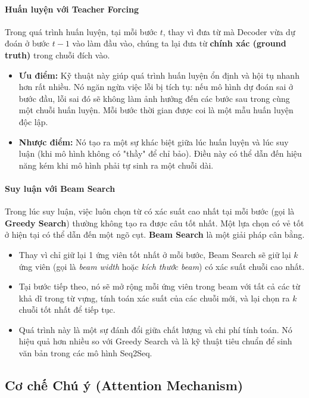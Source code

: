 \paragraph{Huấn luyện với Teacher Forcing}
Trong quá trình huấn luyện, tại mỗi bước $t$, thay vì đưa từ mà Decoder vừa dự đoán ở bước $t-1$ vào làm đầu vào, chúng ta lại đưa từ \textbf{chính xác (ground truth)} trong chuỗi đích vào.
\begin{itemize}
    \item \textbf{Ưu điểm:} Kỹ thuật này giúp quá trình huấn luyện ổn định và hội tụ nhanh hơn rất nhiều. Nó ngăn ngừa việc lỗi bị tích tụ: nếu mô hình dự đoán sai ở bước đầu, lỗi sai đó sẽ không làm ảnh hưởng đến các bước sau trong cùng một chuỗi huấn luyện. Mỗi bước thời gian được coi là một mẫu huấn luyện độc lập.
    \item \textbf{Nhược điểm:} Nó tạo ra một sự khác biệt giữa lúc huấn luyện và lúc suy luận (khi mô hình không có "thầy" để chỉ bảo). Điều này có thể dẫn đến hiệu năng kém khi mô hình phải tự sinh ra một chuỗi dài.
\end{itemize}

\paragraph{Suy luận với Beam Search}
Trong lúc suy luận, việc luôn chọn từ có xác suất cao nhất tại mỗi bước (gọi là \textbf{Greedy Search}) thường không tạo ra được câu tốt nhất. Một lựa chọn có vẻ tốt ở hiện tại có thể dẫn đến một ngõ cụt. \textbf{Beam Search} là một giải pháp cân bằng.
\begin{itemize}
    \item Thay vì chỉ giữ lại 1 ứng viên tốt nhất ở mỗi bước, Beam Search sẽ giữ lại $k$ ứng viên (gọi là \textit{beam width} hoặc \textit{kích thước beam}) có xác suất chuỗi cao nhất.
    \item Tại bước tiếp theo, nó sẽ mở rộng mỗi ứng viên trong beam với tất cả các từ khả dĩ trong từ vựng, tính toán xác suất của các chuỗi mới, và lại chọn ra $k$ chuỗi tốt nhất để tiếp tục.
    \item Quá trình này là một sự đánh đổi giữa chất lượng và chi phí tính toán. Nó hiệu quả hơn nhiều so với Greedy Search và là kỹ thuật tiêu chuẩn để sinh văn bản trong các mô hình Seq2Seq.
\end{itemize}
\subsection{Cơ chế Chú ý (Attention Mechanism)}
\label{ssec:attention}

